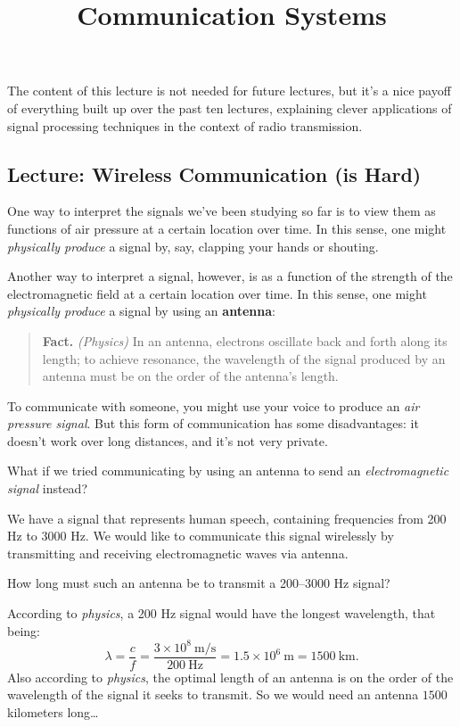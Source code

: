 \title{Communication Systems}



The content of this lecture is not needed for future lectures,
but it's a nice payoff of everything built up over the past ten lectures,
explaining clever applications of signal processing techniques
in the context of radio transmission.

\subsection{Lecture: Wireless Communication (is Hard)}

One way to interpret the signals we've been studying so far
is to view them as functions of air pressure at a certain location over time.
In this sense, one might \emph{physically produce} a signal
by, say, clapping your hands or shouting.

Another way to interpret a signal, however,
is as a function of the strength of the electromagnetic field
at a certain location over time.
In this sense, one might \emph{physically produce} a signal
by using an \textbf{antenna}:

\begin{quote}
    \textbf{Fact.} \emph{(Physics)}
    In an antenna, electrons oscillate back and forth along its length;
    to achieve resonance, the wavelength of the signal produced by an antenna
    must be on the order of the antenna's length.
\end{quote}

To communicate with someone,
you might use your voice to produce an
\emph{air pressure signal}.
But this form of communication has some disadvantages:
it doesn't work over long distances, and it's not very private.

What if we tried communicating by using an antenna
to send an \emph{electromagnetic signal} instead?

\begin{problem}
    We have a signal that represents human speech,
    containing frequencies from 200 Hz to 3000 Hz.
    We would like to communicate this signal wirelessly
    by transmitting and receiving electromagnetic waves via antenna.

    How long must such an antenna be to transmit a 200–3000 Hz signal?
\end{problem}

\begin{solution}
    According to \emph{physics},
    a 200 Hz signal would have the longest wavelength, that being:
    \[ \lambda = \frac{c}{f} = \frac{3 \times 10^8 \ \text{m/s}}{200 \ \text{Hz}}
    = 1.5 \times 10^6 \ \text{m} = 1500 \ \text{km}. \]
    Also according to \emph{physics},
    the optimal length of an antenna is on the order of
    the wavelength of the signal it seeks to transmit.
    So we would need an antenna $1500$ kilometers long\dots
\end{solution}

